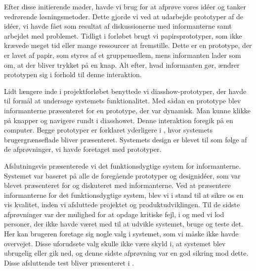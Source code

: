Efter disse initierende møder, havde vi brug for at afprøve vores idéer og tanker vedrørende løsningsmetoder. Dette gjorde vi ved at udarbejde prototyper af de idéer, vi havde fået som resultat af diskussionerne med informanterne samt arbejdet med problemet. Tidligt i forløbet brugt vi papirsprototyper, som ikke krævede meget tid eller mange ressourcer at fremstille. Dette er en prototype, der er lavet af papir, som styres af et gruppemedlem, mens informanten lader som om, at der bliver trykket på en knap. Alt efter, hvad informanten gør, ændrer prototypen sig i forhold til denne interaktion.

Lidt længere inde i projektforløbet benyttede vi diasshow-prototyper, der havde til formål at undersøge systemets funktionalitet. Med sådan en prototype blev informanterne præsenteret for en prototype, der var dynamisk. Man kunne klikke på knapper og navigere rundt i diasshowet. Denne interaktion foregik på en computer. Begge prototyper er forklaret yderligere i , hvor systemets brugergrænseflade bliver præsenteret. Systemets design er blevet til som følge af de afprøvninger, vi havde foretaget med prototyper.

Afslutningsvis præsenterede vi det funktionsdygtige system for informanterne. Systemet var baseret på alle de foregående prototyper og designidéer, som var blevet præsenteret for og diskuteret med informanterne. Ved at præsentere informanterne for det funktionsdygtige system, blev vi i stand til at sikre os en vis kvalitet, inden vi afsluttede projektet og produktudviklingen. Til de sidste afprøvninger var der mulighed for at opdage kritiske fejl, i og med vi lod personer, der ikke havde været med til at udvikle systemet, bruge og teste det. Her kan brugeren foretage sig nogle valg i systemet, som vi måske ikke havde overvejet. Disse uforudsete valg skulle ikke være skyld i, at systemet blev ubrugelig eller gik ned, og denne sidste afprøvning var en god sikring mod dette. Disse afsluttende test bliver præsenteret i .



